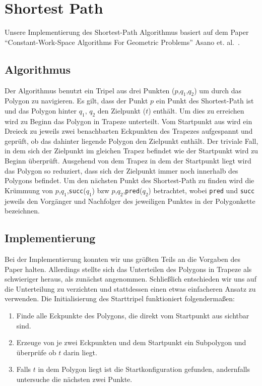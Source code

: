 \section{Shortest Path}

  Unsere Implementierung des Shortest-Path Algorithmus basiert auf dem Paper
  \enquote{Constant-Work-Space Algorithms For Geometric Problems} Asano et.
  al.~\cite{asano11shortestpath}.

  \subsection{Algorithmus}

    Der Algorithmus benutzt ein Tripel aus drei Punkten ($p$,$q_1$,$q_2$) um
    durch das Polygon zu navigieren. Es gilt, dass der Punkt $p$ ein Punkt des
    Shortest-Path ist und das Polygon hinter $q_1$, $q_2$ den Zielpunkt ($t$)
    enthält. Um dies zu erreichen wird zu Beginn das Polygon in Trapeze
    unterteilt. Vom Startpunkt aus wird ein Dreieck zu jeweils zwei
    benachbarten Eckpunkten des Trapezes aufgespannt und geprüft, ob das
    dahinter liegende Polygon den Zielpunkt enthält. Der triviale Fall, in dem
    sich der Zielpunkt im gleichen Trapez befindet wie der Startpunkt wird zu
    Beginn überprüft. Ausgehend von dem Trapez in dem der Startpunkt liegt
    wird das Polygon so reduziert, dass sich der Zielpunkt immer noch
    innerhalb des Polygons befindet. Um den nächsten Punkt des Shortest-Path
    zu finden wird die Krümmung von $p$,$q_1$,\texttt{succ}($q_1$) bzw
    $p$,$q_2$,\texttt{pred}($q_2$) betrachtet, wobei \texttt{pred} und
    \texttt{succ} jeweils den Vorgänger und Nachfolger des jeweiligen Punktes
    in der Polygonkette bezeichnen.

  \subsection{Implementierung}

    Bei der Implementierung konnten wir uns größten Teils an die Vorgaben des
    Paper halten. Allerdings stellte sich das Unterteilen des Polygons in
    Trapeze als schwieriger heraus, als zunächst angenommen. Schließlich
    entschieden wir uns auf die Unterteilung zu verzichten und stattdessen
    einen etwas einfacheren Ansatz zu verwenden. Die Initialisierung des
    Starttripel funktioniert folgendermaßen:

    \begin{enumerate}
      \item Finde alle Eckpunkte des Polygons, die direkt vom Startpunkt aus
            sichtbar sind.
      \item Erzeuge von je zwei Eckpunkten und dem Startpunkt ein Subpolygon
            und überprüfe ob $t$ darin liegt.
      \item Falls $t$ in dem Polygon liegt ist die Startkonfiguration gefunden,
            andernfalls untersuche die nächsten zwei Punkte.
    \end{enumerate}


